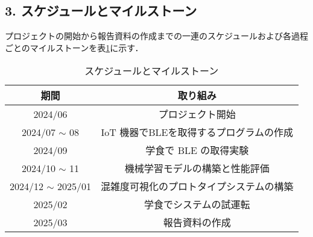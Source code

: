 \subsection*{3. スケジュールとマイルストーン}

プロジェクトの開始から報告資料の作成までの一連のスケジュールおよび各過程ごとのマイルストーンを表\ref{tbl:スケジュールとマイルストーン}に示す．

\begin{table}[htbp]
	\centering
	\caption{スケジュールとマイルストーン}
	\label{tbl:スケジュールとマイルストーン}
	\begin{tabular}{cc} \hline
		期間 & 取り組み　\\ \hline
		2024/06 & プロジェクト開始\\
		2024/07 $\sim$ 08 & IoT 機器でBLEを取得するプログラムの作成\\
		2024/09 & 学食で BLE の取得実験\\
		2024/10 $\sim$ 11 & 機械学習モデルの構築と性能評価\\
		2024/12 $\sim$ 2025/01 & 混雑度可視化のプロトタイプシステムの構築\\ 
		2025/02 & 学食でシステムの試運転\\
		2025/03 & 報告資料の作成\\ \hline
	\end{tabular}
\end{table}